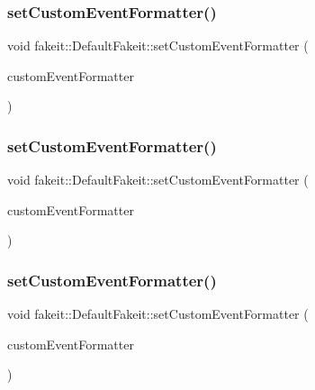 \subsubsection{\texorpdfstring{setCustomEventFormatter()}{setCustomEventFormatter()}\hspace{0.1cm}{\footnotesize\ttfamily [2/9]}}
{\footnotesize\ttfamily void fakeit\+::\+Default\+Fakeit\+::set\+Custom\+Event\+Formatter (\begin{DoxyParamCaption}\item[{\mbox{\hyperlink{structfakeit_1_1EventFormatter}{fakeit\+::\+Event\+Formatter}} \&}]{custom\+Event\+Formatter }\end{DoxyParamCaption})\hspace{0.3cm}{\ttfamily [inline]}}

\mbox{\label{classfakeit_1_1DefaultFakeit_acd1e573c131e25862030cec8cf223035}} 
\subsubsection{\texorpdfstring{setCustomEventFormatter()}{setCustomEventFormatter()}\hspace{0.1cm}{\footnotesize\ttfamily [3/9]}}
{\footnotesize\ttfamily void fakeit\+::\+Default\+Fakeit\+::set\+Custom\+Event\+Formatter (\begin{DoxyParamCaption}\item[{\mbox{\hyperlink{structfakeit_1_1EventFormatter}{fakeit\+::\+Event\+Formatter}} \&}]{custom\+Event\+Formatter }\end{DoxyParamCaption})\hspace{0.3cm}{\ttfamily [inline]}}

\mbox{\label{classfakeit_1_1DefaultFakeit_acd1e573c131e25862030cec8cf223035}} 
\subsubsection{\texorpdfstring{setCustomEventFormatter()}{setCustomEventFormatter()}\hspace{0.1cm}{\footnotesize\ttfamily [4/9]}}
{\footnotesize\ttfamily void fakeit\+::\+Default\+Fakeit\+::set\+Custom\+Event\+Formatter (\begin{DoxyParamCaption}\item[{\mbox{\hyperlink{structfakeit_1_1EventFormatter}{fakeit\+::\+Event\+Formatter}} \&}]{custom\+Event\+Formatter }\end{DoxyParamCaption})\hspace{0.3cm}{\ttfamily [inline]}}

